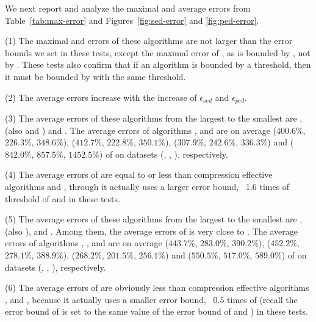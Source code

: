 {%




 We next report and analyze the maximal and average errors from Table~\ref{tab:max-error} and Figures~\ref{fig:sed-error} and \ref{fig:ped-error}.


\ni (1) The maximal \ped and \sed errors of these algorithms are not larger than the error bounds we set in these tests, except the maximal \sed error of \sitt, as \sitt is bounded by \ped, not by \sed. These tests also confirm that if an algorithm is bounded by a \sed threshold, then it must be bounded by \ped with the same threshold.

\ni (2) The average errors increase with the increase of $\epsilon_{sed}$ and $\epsilon_{ped}$.

\ni (3) The average \sed errors of these algorithms from the largest to the smallest are \sitt, \citt (also \grts and \bitt) and \ldrh. The average \sed errors of algorithms \grts, \citt \bitt and \sitt are on average
($400.6\%$, $226.3\%$, $348.6\%$), ($412.7\%$, $222.8\%$, $350.1\%$), ($307.9\%$, $242.6\%$, $336.3\%$) and ($842.0\%$, $857.5\%$, $1452.5\%$)
of \ldrh on datasets (\mopsi, \sercar, \geolife), respectively.

\ni (4) The average \sed errors of \bitt are equal to or less than compression effective algorithms \grts and \citt, through it actually uses a larger \sed error bound, \ie~1.6 times of \sed threshold of \grts and \citt in these tests.

\ni (5) The average \ped errors of these algorithms from the largest to the smallest are \sitt, \grts (also \citt), \bitt and \ldrh. Among them, the average \ped errors of \citt is very close to \grts. The average \ped errors of algorithms \grts, \citt, \bitt and \sitt are on average
($443.7\%$, $ 283.0\%$, $ 390.2\%$), ($452.2\%$, $278.1\%$, $388.9\%$), ($ 268.2\%$, $ 201.5\%$, $ 256.1\%$)
and ($550.5\%$, $517.0\%$, $589.0\%$)
of \ldrh on datasets (\mopsi, \sercar, \geolife), respectively.

\ni (6) The average \ped errors of \bitt are obviously less than compression effective algorithms \grts, \citt and \sitt, because it actually uses a smaller \ped error bound, \ie~$0.5$ times \ped of \sitt (recall the \ped error bound of \sitt is set to the same value of the \sed error bound of \grts and \citt) in these tests.



}
